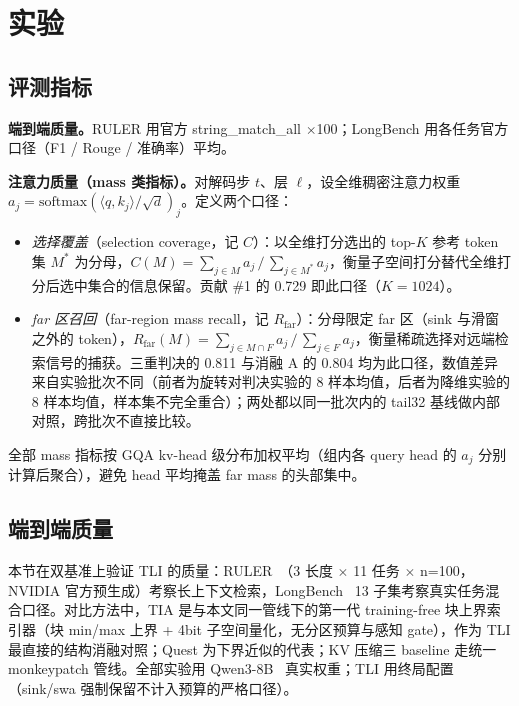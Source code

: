 \documentclass[11pt]{article}
\begin{document}
\section{实验}

\subsection{评测指标}

\textbf{端到端质量。}RULER 用官方 string\_match\_all $\times$100；LongBench 用各任务官方口径（F1 / Rouge / 准确率）平均。

\textbf{注意力质量（mass 类指标）。}对解码步 $t$、层 $\ell$，设全维稠密注意力权重 $a_j = \mathrm{softmax}(\langle q, k_j\rangle / \sqrt{d})_j$。定义两个口径：
\begin{itemize}
\item \emph{选择覆盖}（selection coverage，记 $C$）：以全维打分选出的 top-$K$ 参考 token 集 $M^\ast$ 为分母，$C(M) = \sum_{j \in M} a_j \,/\, \sum_{j \in M^\ast} a_j$，衡量子空间打分替代全维打分后选中集合的信息保留。贡献 \#1 的 0.729 即此口径（$K{=}1024$）。
\item \emph{far 区召回}（far-region mass recall，记 $R_{\mathrm{far}}$）：分母限定 far 区（sink 与滑窗之外的 token），$R_{\mathrm{far}}(M) = \sum_{j \in M \cap F} a_j \,/\, \sum_{j \in F} a_j$，衡量稀疏选择对远端检索信号的捕获。三重判决的 0.811 与消融 A 的 0.804 均为此口径，数值差异来自实验批次不同（前者为旋转对判决实验的 8 样本均值，后者为降维实验的 8 样本均值，样本集不完全重合）；两处都以同一批次内的 tail32 基线做内部对照，跨批次不直接比较。
\end{itemize}
全部 mass 指标按 GQA kv-head 级分布加权平均（组内各 query head 的 $a_j$ 分别计算后聚合），避免 head 平均掩盖 far mass 的头部集中。

\subsection{端到端质量}

本节在双基准上验证 TLI 的质量：RULER~\cite{ruler}（3 长度 $\times$ 11 任务 $\times$ n=100，NVIDIA 官方预生成）考察长上下文检索，LongBench~\cite{longbench} 13 子集考察真实任务混合口径。对比方法中，TIA 是与本文同一管线下的第一代 training-free 块上界索引器（块 min/max 上界 + 4bit 子空间量化，无分区预算与感知 gate），作为 TLI 最直接的结构消融对照；Quest 为下界近似的代表；KV 压缩三 baseline 走统一 monkeypatch 管线。全部实验用 Qwen3-8B~\cite{qwen3} 真实权重；TLI 用终局配置（sink/swa 强制保留不计入预算的严格口径）。
\end{document}
